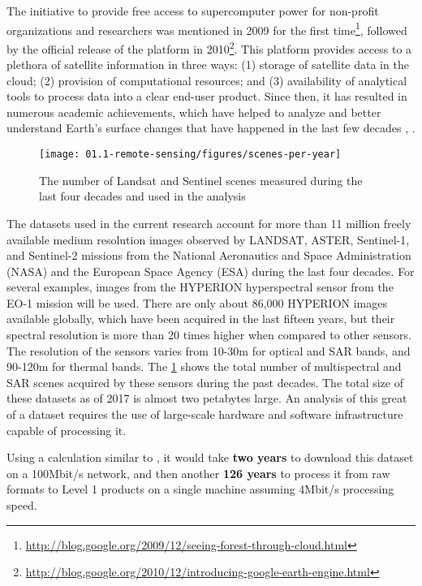 The initiative to provide free access to supercomputer power for non-profit organizations and researchers was mentioned in 2009 for the first time\footnote{\url{http://blog.google.org/2009/12/seeing-forest-through-cloud.html}}, followed by the official release of the platform in 2010\footnote{\url{http://blog.google.org/2010/12/introducing-google-earth-engine.html}}. This platform provides access to a plethora of satellite information in three ways: (1) storage of satellite data in the cloud; (2) provision of computational resources; and (3) availability of analytical tools to process data into a clear end-user product. Since then, it has resulted in numerous academic achievements, which have helped to analyze and better understand Earth's surface changes that have happened in the last few decades \citet{Hansen2013}, \citet{pekel2016high}. 

\begin{figure}
	\centering
	\texttt{[image: 01.1-remote-sensing/figures/scenes-per-year]}
	\caption{The number of Landsat and Sentinel scenes measured during the last four decades and used in the analysis}
	\label{fig:sensor-count}
\end{figure}

The datasets used in the current research account for more than 11 million freely available medium resolution images observed by LANDSAT, ASTER, Sentinel-1, and Sentinel-2 missions from the National Aeronautics and Space Administration (NASA) and the European Space Agency (ESA) during the last four decades. For several examples, images from the HYPERION hyperspectral sensor from the EO-1 mission will be used. There are only about 86,000 HYPERION images available globally, which have been acquired in the last fifteen years, but their spectral resolution is more than 20 times higher when compared to other sensors. The resolution of the sensors varies from 10-30m for optical and SAR bands, and 90-120m for thermal bands. The \ref{fig:sensor-count} shows the total number of multispectral and SAR scenes acquired by these sensors during the past decades. The total size of these datasets as of 2017 is almost two petabytes large. An analysis of this great of a dataset requires the use of large-scale hardware and software infrastructure capable of processing it.

Using a calculation similar to \citet{wagner2015big}, it would take \textbf{two years} to download this dataset on a 100Mbit/s network, and then another \textbf{126 years} to process it from raw formats to Level 1 products on a single machine assuming 4Mbit/s processing speed.

